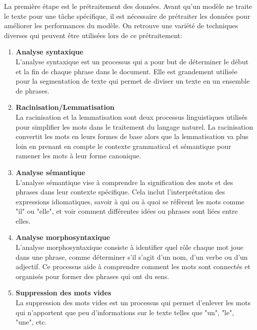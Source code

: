 \documentclass{rapport}
\begin{document}
La première étape est le prétraitement des données. Avant qu'un modèle ne traite le texte pour une tâche spécifique, il est nécessaire de prétraiter les données pour améliorer les performances du modèle. On retrouve une variété de techniques diverses qui peuvent être utilisées lors de ce prétraitement:
\begin{enumerate}[listparindent=0pt, parsep=0pt]

    \item \textbf{Analyse syntaxique}\\
    L'analyse syntaxique est un processus qui a pour but de déterminer le début et la fin de chaque phrase dans le document. Elle est grandement utilisée pour la segmentation de texte qui permet de diviser un texte en un ensemble de phrases.\\
    
    \item \textbf{Racinisation/Lemmatisation}\\
    La racinisation et la lemmatisation sont deux processus linguistiques utilisés pour simplifier les mots dans le traitement du langage naturel. La racinisation convertit les mots en leurs formes de base alors que la lemmatisation va plus loin en prenant en compte le contexte grammatical et sémantique pour ramener les mots à leur forme canonique.\\
    
    \item \textbf{Analyse sémantique}\\
    L'analyse sémantique vise à comprendre la signification des mots et des phrases dans leur contexte spécifique. Cela inclut l'interprétation des expressions idiomatiques\footnotemark[1], savoir à qui ou à quoi se réfèrent les mots comme "il" ou "elle", et voir comment différentes idées ou phrases sont liées entre elles.\\

    \item \textbf{Analyse morphosyntaxique}\\
    L'analyse morphosyntaxique consiste à identifier quel rôle chaque mot joue dans une phrase, comme déterminer s'il s'agit d'un nom, d'un verbe ou d'un adjectif. Ce processus aide à comprendre comment les mots sont connectés et organisés pour former des phrases qui ont du sens. \\

    \item \textbf{Suppression des mots vides}\\
    La suppression des mots vides est un processus qui permet d'enlever les mots qui n'apportent que peu d'informations sur le texte telles que "un", "le", "une", etc.\\


\end{enumerate}
\end{document}
